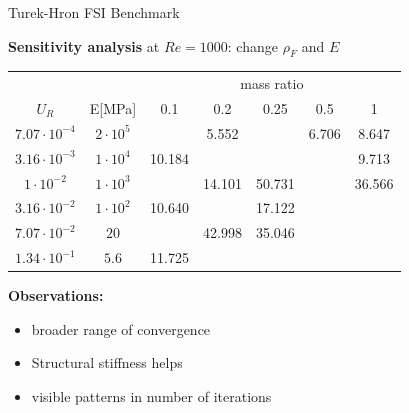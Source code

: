 \documentclass[10pt,t]{beamer}
\begin{document}
\begin{frame}{Turek-Hron FSI Benchmark}

\textbf{Sensitivity analysis} at $Re=1000$: change $\rho_F$ and $E$ 


\footnotesize
\begin{center}
		\begin{tabular}{ c | c | c c c c c |} 
			&  & \multicolumn{5}{c|}{mass ratio} \\
			
			$U_R$ & E[\si{MPa}] & 0.1 & 0.2 & 0.25 & 0.5 & 1 \\
			\hline
			
			$7.07\cdot 10^{-4}$ & $2\cdot 10^{5}$ & \cellcolor{green!10} & \cellcolor{green!10}5.552 & \cellcolor{green!10} & \cellcolor{green!10}6.706 & \cellcolor{green!10}8.647 \\
			$3.16\cdot 10^{-3}$ & $1\cdot 10^{4}$ & \cellcolor{green!10}10.184 & \cellcolor{green!10} & \cellcolor{green!10} & \cellcolor{green!10} & \cellcolor{green!10}9.713 \\        
			$1\cdot 10^{-2}$ & $1\cdot 10^{3}$ & \cellcolor{green!10} & \cellcolor{green!10}14.101 & \cellcolor{green!10}50.731 & \cellcolor{green!10} & \cellcolor{green!10}36.566 \\
			$3.16\cdot 10^{-2}$ & $1\cdot 10^{2}$ & \cellcolor{green!10}10.640 & \cellcolor{green!10} & \cellcolor{green!10}17.122 & \cellcolor{red!10} & \cellcolor{red!10} \\
			$7.07\cdot 10^{-2}$ & $20$ & \cellcolor{green!10} & \cellcolor{green!10}42.998 & \cellcolor{green!10}35.046 & \cellcolor{red!10} & \cellcolor{red!10} \\
			$1.34\cdot 10^{-1}$ & $5.6$ & \cellcolor{green!10}11.725 & \cellcolor{red!10} & \cellcolor{red!10} & \cellcolor{red!10} & \cellcolor{red!10} \\
			\hline                        
		\end{tabular}
	\end{center}

\vspace{0.35cm}

\normalsize

\textbf{Observations:}
\begin{itemize}
    \item broader range of convergence
    \item Structural stiffness helps
    \item visible patterns in number of iterations
\end{itemize}

\vspace{0.25cm}

\hyperlink{fsi2}{}

\end{frame}
\end{document}
